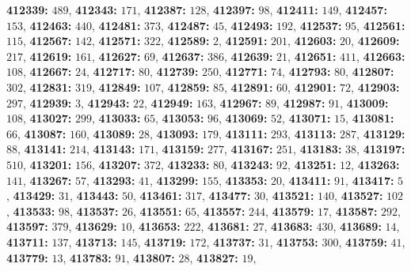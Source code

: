 \textsf{\bfseries 412339:} $489$, \textsf{\bfseries 412343:} $171$, \textsf{\bfseries 412387:} $128$, \textsf{\bfseries 412397:} $98$, \textsf{\bfseries 412411:} $149$, \textsf{\bfseries 412457:} $153$, \textsf{\bfseries 412463:} $440$, \textsf{\bfseries 412481:} $373$, \textsf{\bfseries 412487:} $45$, \textsf{\bfseries 412493:} $192$, \textsf{\bfseries 412537:} $95$, \textsf{\bfseries 412561:} $115$, \textsf{\bfseries 412567:} $142$, \textsf{\bfseries 412571:} $322$, \textsf{\bfseries 412589:} $2$, \textsf{\bfseries 412591:} $201$, \textsf{\bfseries 412603:} $20$, \textsf{\bfseries 412609:} $217$, \textsf{\bfseries 412619:} $161$, \textsf{\bfseries 412627:} $69$, \textsf{\bfseries 412637:} $386$, \textsf{\bfseries 412639:} $21$, \textsf{\bfseries 412651:} $411$, \textsf{\bfseries 412663:} $108$, \textsf{\bfseries 412667:} $24$, \textsf{\bfseries 412717:} $80$, \textsf{\bfseries 412739:} $250$, \textsf{\bfseries 412771:} $74$, \textsf{\bfseries 412793:} $80$, \textsf{\bfseries 412807:} $302$, \textsf{\bfseries 412831:} $319$, \textsf{\bfseries 412849:} $107$, \textsf{\bfseries 412859:} $85$, \textsf{\bfseries 412891:} $60$, \textsf{\bfseries 412901:} $72$, \textsf{\bfseries 412903:} $297$, \textsf{\bfseries 412939:} $3$, \textsf{\bfseries 412943:} $22$, \textsf{\bfseries 412949:} $163$, \textsf{\bfseries 412967:} $89$, \textsf{\bfseries 412987:} $91$, \textsf{\bfseries 413009:} $108$, \textsf{\bfseries 413027:} $299$, \textsf{\bfseries 413033:} $65$, \textsf{\bfseries 413053:} $96$, \textsf{\bfseries 413069:} $52$, \textsf{\bfseries 413071:} $15$, \textsf{\bfseries 413081:} $66$, \textsf{\bfseries 413087:} $160$, \textsf{\bfseries 413089:} $28$, \textsf{\bfseries 413093:} $179$, \textsf{\bfseries 413111:} $293$, \textsf{\bfseries 413113:} $287$, \textsf{\bfseries 413129:} $88$, \textsf{\bfseries 413141:} $214$, \textsf{\bfseries 413143:} $171$, \textsf{\bfseries 413159:} $277$, \textsf{\bfseries 413167:} $251$, \textsf{\bfseries 413183:} $38$, \textsf{\bfseries 413197:} $510$, \textsf{\bfseries 413201:} $156$, \textsf{\bfseries 413207:} $372$, \textsf{\bfseries 413233:} $80$, \textsf{\bfseries 413243:} $92$, \textsf{\bfseries 413251:} $12$, \textsf{\bfseries 413263:} $141$, \textsf{\bfseries 413267:} $57$, \textsf{\bfseries 413293:} $41$, \textsf{\bfseries 413299:} $155$, \textsf{\bfseries 413353:} $20$, \textsf{\bfseries 413411:} $91$, \textsf{\bfseries 413417:} $5$, \textsf{\bfseries 413429:} $31$, \textsf{\bfseries 413443:} $50$, \textsf{\bfseries 413461:} $317$, \textsf{\bfseries 413477:} $30$, \textsf{\bfseries 413521:} $140$, \textsf{\bfseries 413527:} $102$, \textsf{\bfseries 413533:} $98$, \textsf{\bfseries 413537:} $26$, \textsf{\bfseries 413551:} $65$, \textsf{\bfseries 413557:} $244$, \textsf{\bfseries 413579:} $17$, \textsf{\bfseries 413587:} $292$, \textsf{\bfseries 413597:} $379$, \textsf{\bfseries 413629:} $10$, \textsf{\bfseries 413653:} $222$, \textsf{\bfseries 413681:} $27$, \textsf{\bfseries 413683:} $430$, \textsf{\bfseries 413689:} $14$, \textsf{\bfseries 413711:} $137$, \textsf{\bfseries 413713:} $145$, \textsf{\bfseries 413719:} $172$, \textsf{\bfseries 413737:} $31$, \textsf{\bfseries 413753:} $300$, \textsf{\bfseries 413759:} $41$, \textsf{\bfseries 413779:} $13$, \textsf{\bfseries 413783:} $91$, \textsf{\bfseries 413807:} $28$, \textsf{\bfseries 413827:} $19$, 
